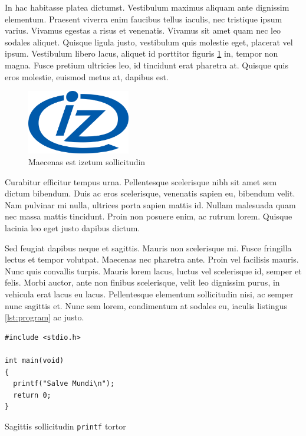 \documentclass[polish,engineering]{wizthesis}
\begin{document}
In hac habitasse platea dictumst. Vestibulum maximus aliquam ante dignissim elementum. Praesent viverra enim faucibus tellus iaculis, nec tristique ipsum varius. Vivamus egestas a risus et venenatis. Vivamus sit amet quam nec leo sodales aliquet. Quisque ligula justo, vestibulum quis molestie eget, placerat vel ipsum. Vestibulum libero lacus, aliquet id porttitor figuris \ref{fig:iz} in, tempor non magna. Fusce pretium ultricies leo, id tincidunt erat pharetra at. Quisque quis eros molestie, euismod metus at, dapibus est.
\begin{figure}[ht]
  \centering
  \includegraphics[width=0.4\textwidth]{img/iz_logo.png}
  \caption{Maecenas est izetum sollicitudin}
  \label{fig:iz}
\end{figure}

Curabitur efficitur tempus urna. Pellentesque scelerisque nibh sit amet sem dictum bibendum. Duis ac eros scelerisque, venenatis sapien eu, bibendum velit. Nam pulvinar mi nulla, ultrices porta sapien mattis id. Nullam malesuada quam nec massa mattis tincidunt. Proin non posuere enim, ac rutrum lorem. Quisque lacinia leo eget justo dapibus dictum.

Sed feugiat dapibus neque et sagittis. Mauris non scelerisque mi. Fusce fringilla lectus et tempor volutpat. Maecenas nec pharetra ante. Proin vel facilisis mauris. Nunc quis convallis turpis. Mauris lorem lacus, luctus vel scelerisque id, semper et felis. Morbi auctor, ante non finibus scelerisque, velit leo dignissim purus, in vehicula erat lacus eu lacus. Pellentesque elementum sollicitudin nisi, ac semper nunc sagittis et. Nunc sem lorem, condimentum at sodales eu, iaculis listingus \ref{lst:program} ac justo.
\begin{listing}[H]
  \begin{verbatim}
#include <stdio.h>

int main(void)
{
  printf("Salve Mundi\n");
  return 0;
}
  \end{verbatim}
  \caption{Sagittis sollicitudin \texttt{printf} tortor}
  \label{lst:program}
\end{listing}
\end{document}
